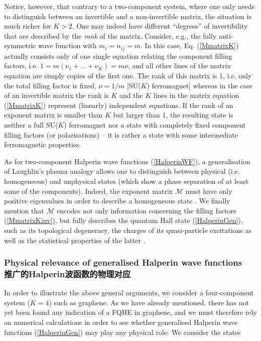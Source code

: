 \documentclass[10pt]{book}
\newcommand{\Mmath}{\mathcal{M}}
\begin{document}
Notice, however, that contrary to a two-component system, where one only needs to distinguish between an invertible and a 
non-invertible matrix, the situation is much richer for $K>2$. One may indeed have different ``degrees'' of invertibility 
that are described by the {\sl rank} of the matrix. Consider, e.g., the fully anti-symmetric wave function with
$m_i=n_{ij}=m$. In this case, Eq. (\ref{MmatrixK}) actually consists only of one single equation relating the component
filling factors, i.e. $1=m(\nu_1 + ... + \nu_K)=m\nu$, and all other lines of the matrix equation are simply copies of the
first one. The rank of this matrix is 1, i.e. only the total filling factor is fixed, $\nu=1/m$ [SU($K$) ferromagnet]
whereas in the case of an invertible matrix the rank is $K$ and the $K$ lines
in the matrix equation (\ref{MmatrixK}) represent (linearly) independent equations. If the rank of an exponent matrix
is smaller than $K$ but larger than 1, the resulting state is neither a full SU($K$) ferromagnet nor a state with
completely fixed component filling factors (or polarisations) -- it is rather a state with some intermediate ferromagnetic 
properties. 

As for two-component Halperin wave functions (\ref{HalperinWF}), a generalisation of Laughlin's plasma analogy allows one 
to distinguish between physical (i.e. homogeneous) and unphysical states (which show a phase separation of at least some of the
components). Indeed, the exponent matrix $\Mmath$ must have only positive eigenvalues in order to describe a homogeneous 
state \cite{dGRG}. We finally mention that $\Mmath$ encodes not only information concerning the filling factors (\ref{MmatrixKinv}),
but fully describes the quantum Hall state (\ref{HalperinGen}), such as its topological degeneracy,
the charges of its quasi-particle excitations as well as the statistical properties of the latter \cite{WenZee}.


\iffalse
\subsubsection[推广的Halperin波函数的物理对应]{Physical relevance of generalised Halperin wave functions\\\bf 推广的Halperin波函数的物理对应}

In order to illustrate the above general arguments, we consider a four-component system ($K=4$) such as graphene. 
As we have already mentioned, there has not yet been found any indication of a FQHE in graphene, and we must therefore
rely on numerical calculations in order to see whether generalised Halperin wave functions (\ref{HalperinGen})
may play any physical role. We consider the states 
\end{document}
